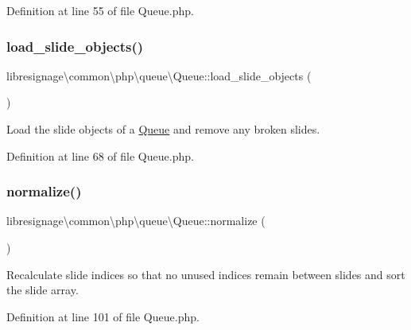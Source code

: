 Definition at line 55 of file Queue.\+php.

\mbox{\label{classlibresignage_1_1common_1_1php_1_1queue_1_1Queue_a7f3e6f40d82ea9858406105e1a45718b}} 
\subsubsection{\texorpdfstring{load\+\_\+slide\+\_\+objects()}{load\_slide\_objects()}}
{\footnotesize\ttfamily libresignage\textbackslash{}common\textbackslash{}php\textbackslash{}queue\textbackslash{}\+Queue\+::load\+\_\+slide\+\_\+objects (\begin{DoxyParamCaption}{ }\end{DoxyParamCaption})}

Load the slide objects of a \hyperlink{classlibresignage_1_1common_1_1php_1_1queue_1_1Queue}{Queue} and remove any broken slides. 

Definition at line 68 of file Queue.\+php.

\mbox{\label{classlibresignage_1_1common_1_1php_1_1queue_1_1Queue_a3e1f363824046aa32e8ad9b9c214f43f}} 
\subsubsection{\texorpdfstring{normalize()}{normalize()}}
{\footnotesize\ttfamily libresignage\textbackslash{}common\textbackslash{}php\textbackslash{}queue\textbackslash{}\+Queue\+::normalize (\begin{DoxyParamCaption}{ }\end{DoxyParamCaption})}

Recalculate slide indices so that no unused indices remain between slides and sort the slide array. 

Definition at line 101 of file Queue.\+php.

